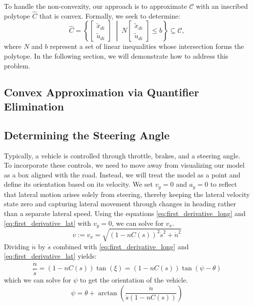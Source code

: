 To handle the non-convexity, our approach is to approximate \(\mathcal{C}\) with an inscribed polytope \(\hat{C}\) that is convex.
Formally, we seek to determine:
\begin{equation}
	\hat{C} = \left\{ \begin{bmatrix}
		\tilde{x}_{di} \\[2mm] \tilde{u}_{di}
	\end{bmatrix} \; \middle|\;
	N \begin{bmatrix}
		\tilde{x}_{di} \\[2mm] \tilde{u}_{di}
	\end{bmatrix} \leq b
	\right\} \subseteq \mathcal{C},
\end{equation}
where \(N\) and \(b\) represent a set of linear inequalities whose intersection forms the polytope.
In the following section, we will demonstrate how to address this problem.

\subsection{Convex Approximation via Quantifier Elimination}


\subsection{Determining the Steering Angle} \label{subsec:determining_the_steering_angle}

Typically, a vehicle is controlled through throttle, brakes, and a steering angle.
To incorporate these controls, we need to move away from visualizing our model as a box aligned with the road.
Instead, we will treat the model as a point and define its orientation based on its velocity.
We set $v_y = 0$ and $a_y=0$ to reflect that lateral motion arises solely from steering, thereby keeping the lateral velocity state zero and
capturing lateral movement through changes in heading rather than a separate lateral speed.
Using the equations \eqref{eq:first_derivative_long} and \eqref{eq:first_derivative_lat} with $v_y = 0$, we can solve for $v_x$.
\begin{equation}
	v := v_x = \sqrt{(1-nC(s))^2\dot{s}^2 + \dot{n}^2}
\end{equation}
Dividing $\dot{n}$ by $\dot{s}$ combined with  \eqref{eq:first_derivative_long} and \eqref{eq:first_derivative_lat} yields:
\begin{equation}
	\frac{\dot{n}}{\dot{s}} = (1-nC(s))\tan(\xi) = (1-nC(s))\tan(\psi - \theta)
\end{equation}
which we can solve for $\psi$ to get the orientation of the vehicle.
\begin{equation}
	\psi = \theta + \arctan\left(\frac{\dot{n}}{\dot{s}(1-nC(s))}\right)
\end{equation}

